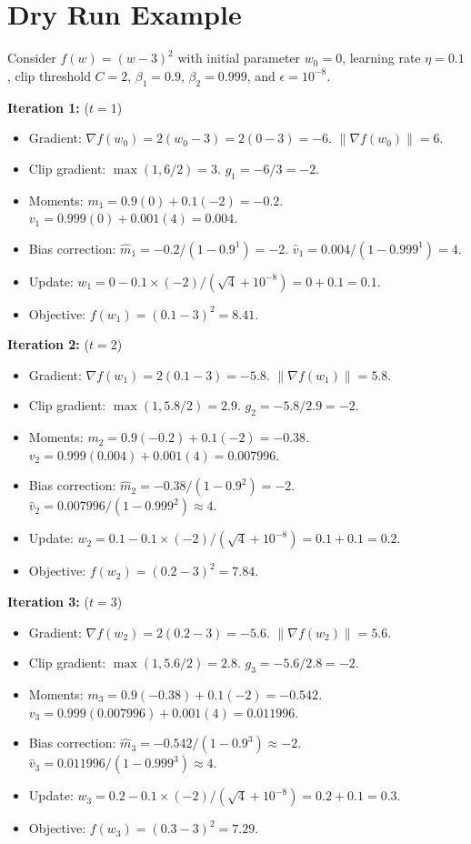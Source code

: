 \documentclass{article}
\begin{document}
\section*{Dry Run Example}
Consider $f(w) = (w-3)^2$ with initial parameter $w_0 = 0$, learning rate $\eta = 0.1$, clip threshold $C = 2$, $\beta_1 = 0.9$, $\beta_2 = 0.999$, and $\epsilon = 10^{-8}$.

\textbf{Iteration 1:} ($t=1$)
\begin{itemize}
\item Gradient: $\nabla f(w_0) = 2(w_0 - 3) = 2(0 - 3) = -6$. $\|\nabla f(w_0)\| = 6$.
\item Clip gradient: $\max(1, 6/2) = 3$. $g_1 = -6 / 3 = -2$.
\item Moments: $m_1 = 0.9(0) + 0.1(-2) = -0.2$. $v_1 = 0.999(0) + 0.001(4) = 0.004$.
\item Bias correction: $\hat{m}_1 = -0.2 / (1 - 0.9^1) = -2$. $\hat{v}_1 = 0.004 / (1 - 0.999^1) = 4$.
\item Update: $w_1 = 0 - 0.1 \times (-2) / (\sqrt{4} + 10^{-8}) = 0 + 0.1 = 0.1$.
\item Objective: $f(w_1) = (0.1 - 3)^2 = 8.41$.
\end{itemize}

\textbf{Iteration 2:} ($t=2$)
\begin{itemize}
\item Gradient: $\nabla f(w_1) = 2(0.1 - 3) = -5.8$. $\|\nabla f(w_1)\| = 5.8$.
\item Clip gradient: $\max(1, 5.8/2) = 2.9$. $g_2 = -5.8 / 2.9 = -2$.
\item Moments: $m_2 = 0.9(-0.2) + 0.1(-2) = -0.38$. $v_2 = 0.999(0.004) + 0.001(4) = 0.007996$.
\item Bias correction: $\hat{m}_2 = -0.38 / (1 - 0.9^2) = -2$. $\hat{v}_2 = 0.007996 / (1 - 0.999^2) \approx 4$.
\item Update: $w_2 = 0.1 - 0.1 \times (-2) / (\sqrt{4} + 10^{-8}) = 0.1 + 0.1 = 0.2$.
\item Objective: $f(w_2) = (0.2 - 3)^2 = 7.84$.
\end{itemize}

\textbf{Iteration 3:} ($t=3$)
\begin{itemize}
\item Gradient: $\nabla f(w_2) = 2(0.2 - 3) = -5.6$. $\|\nabla f(w_2)\| = 5.6$.
\item Clip gradient: $\max(1, 5.6/2) = 2.8$. $g_3 = -5.6 / 2.8 = -2$.
\item Moments: $m_3 = 0.9(-0.38) + 0.1(-2) = -0.542$. $v_3 = 0.999(0.007996) + 0.001(4) = 0.011996$.
\item Bias correction: $\hat{m}_3 = -0.542 / (1 - 0.9^3) \approx -2$. $\hat{v}_3 = 0.011996 / (1 - 0.999^3) \approx 4$.
\item Update: $w_3 = 0.2 - 0.1 \times (-2) / (\sqrt{4} + 10^{-8}) = 0.2 + 0.1 = 0.3$.
\item Objective: $f(w_3) = (0.3 - 3)^2 = 7.29$.
\end{itemize}
\end{document}
